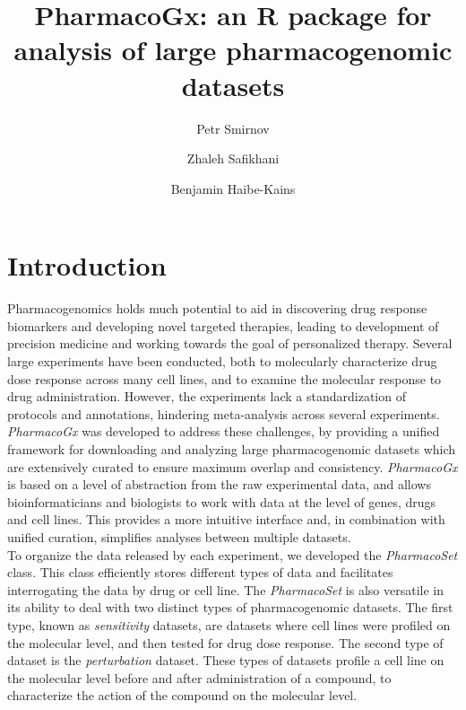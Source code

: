 \documentclass[11pt]{article}
\title{PharmacoGx: an R package for analysis of large pharmacogenomic datasets}
\author[1]{Petr Smirnov}
\author[1,2]{Zhaleh Safikhani}
\author[1,2]{Benjamin Haibe-Kains}
\affil[1]{Princess Margaret Cancer Centre, University Health Network, Toronto Canada}
\affil[2]{Department of Medical Biophysics, University of Toronto, Toronto Canada}
\begin{document}


\maketitle
\tableofcontents

\section{Introduction}

Pharmacogenomics holds much potential to aid in discovering drug response
biomarkers and developing novel targeted therapies, leading to development of
precision medicine and working towards the goal of personalized therapy.
Several large experiments have been conducted, both to molecularly
characterize drug dose response across many cell lines, and to examine the
molecular response to drug administration. However, the experiments lack a
standardization of protocols and annotations, hindering meta-analysis across
several experiments.\\

\textit{PharmacoGx} was developed to address these challenges, by providing a
unified framework for downloading and analyzing large pharmacogenomic datasets
which are extensively curated to ensure maximum overlap and consistency.
\textit{PharmacoGx} is based on a level of abstraction from the raw
experimental data, and allows bioinformaticians and biologists to work with
data at the level of genes, drugs and cell lines. This provides a more
intuitive interface and, in combination with unified curation, simplifies
analyses between multiple datasets.\\

To organize the data released by each experiment, we developed the
\textit{PharmacoSet} class. This class efficiently stores different types of
data and facilitates interrogating the data by drug or cell line. The
\textit{PharmacoSet} is also versatile in its ability to deal with two
distinct types of pharmacogenomic datasets. The first type, known as
\textit{sensitivity} datasets, are datasets where cell lines were profiled
on the molecular level, and then tested for drug dose response. The second
type of dataset is the \textit{perturbation} dataset. These types of
datasets profile a cell line on the molecular level before and after
administration of a compound, to characterize the action of the compound on
the molecular level.\\
\end{document}
